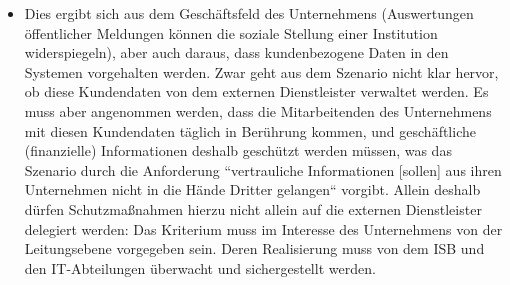 \begin{itemize}
\item[] Dies ergibt sich aus dem Geschäftsfeld des Unternehmens (Auswertungen öffentlicher Meldungen können die soziale Stellung einer Institution widerspiegeln), aber auch daraus, dass kundenbezogene Daten in den Systemen vorgehalten werden. Zwar geht aus dem Szenario nicht klar hervor, ob diese Kundendaten von dem externen Dienstleister verwaltet werden. Es muss aber angenommen werden, dass die Mitarbeitenden des Unternehmens mit diesen Kundendaten täglich in Berührung kommen, und geschäftliche (finanzielle) Informationen deshalb geschützt werden müssen, was das Szenario durch die Anforderung ``vertrauliche Informationen [sollen] aus ihren Unternehmen nicht in die Hände Dritter gelangen`` vorgibt. Allein deshalb dürfen Schutzmaßnahmen hierzu nicht allein auf die externen Dienstleister delegiert werden: Das Kriterium muss im Interesse des Unternehmens von der Leitungsebene vorgegeben sein. Deren Realisierung muss von dem ISB und den IT-Abteilungen überwacht und sichergestellt werden.
\end{itemize}
